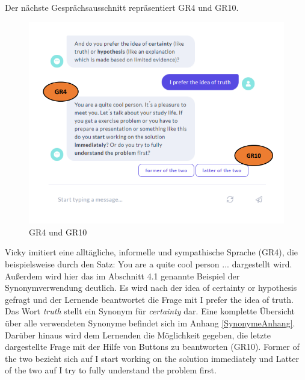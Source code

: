 Der nächste Gesprächsausschnitt repräsentiert GR4 und GR10.
\begin{figure}[H]
  \centering
  \includegraphics[width=0.7\linewidth]{images/GR4_GR10.png}
  \caption[GR4, GR5 und GR8]{GR4 und GR10}
  \label{fig:GR5_GR4_GR10}
\end{figure}  
Vicky imitiert eine alltägliche, informelle und sympathische 
Sprache (GR4), die beispielsweise durch den Satz: 
\glqq You are a quite cool person ...\grqq{} 
dargestellt wird. Außerdem wird hier das  im Abschnitt 4.1 genannte Beispiel der Synonymverwendung deutlich. 
Es wird nach der \glqq idea of certainty or hypothesis\grqq{} gefragt und 
der Lernende beantwortet die Frage mit  \glqq I prefer the idea of truth\grqq{}.
Das Wort \textit{truth} stellt ein Synonym für \textit{certainty} dar. 
Eine komplette Übersicht über alle verwendeten Synonyme befindet sich im Anhang \ref{SynonymeAnhang}.
Darüber hinaus wird dem Lernenden die Möglichkeit 
gegeben, die letzte dargestellte Frage 
mit der Hilfe von Buttons zu beantworten (GR10). 
\glqq Former of the two \grqq{} bezieht sich auf \glqq I start working on the solution immediately\grqq{}
und \glqq Latter of the two \grqq{} auf \glqq I try to fully understand the problem first\grqq{}.

